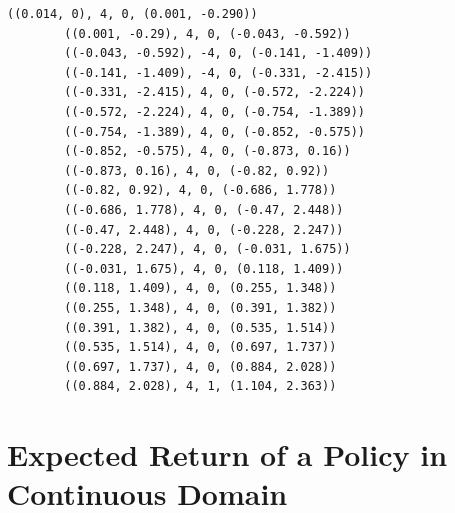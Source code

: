 \documentclass[a4paper, 12pt]{article}
\begin{document}
    \begin{lstlisting}[style=defaultFrameTB, gobble=8, caption={A terminating trajectory of the policy \eqref{eq:stepback.policy}.}, label={lst:simulated.domain}]
        ((0.014, 0), 4, 0, (0.001, -0.290))
        ((0.001, -0.29), 4, 0, (-0.043, -0.592))
        ((-0.043, -0.592), -4, 0, (-0.141, -1.409))
        ((-0.141, -1.409), -4, 0, (-0.331, -2.415))
        ((-0.331, -2.415), 4, 0, (-0.572, -2.224))
        ((-0.572, -2.224), 4, 0, (-0.754, -1.389))
        ((-0.754, -1.389), 4, 0, (-0.852, -0.575))
        ((-0.852, -0.575), 4, 0, (-0.873, 0.16))
        ((-0.873, 0.16), 4, 0, (-0.82, 0.92))
        ((-0.82, 0.92), 4, 0, (-0.686, 1.778))
        ((-0.686, 1.778), 4, 0, (-0.47, 2.448))
        ((-0.47, 2.448), 4, 0, (-0.228, 2.247))
        ((-0.228, 2.247), 4, 0, (-0.031, 1.675))
        ((-0.031, 1.675), 4, 0, (0.118, 1.409))
        ((0.118, 1.409), 4, 0, (0.255, 1.348))
        ((0.255, 1.348), 4, 0, (0.391, 1.382))
        ((0.391, 1.382), 4, 0, (0.535, 1.514))
        ((0.535, 1.514), 4, 0, (0.697, 1.737))
        ((0.697, 1.737), 4, 0, (0.884, 2.028))
        ((0.884, 2.028), 4, 1, (1.104, 2.363))
    \end{lstlisting}
    
    \newpage
    
    \section{Expected Return of a Policy in Continuous Domain}\label{sec:expected.return}
    
\end{document}

